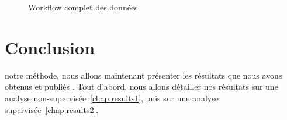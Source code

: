 			\begin{figure}
				\begin{center}
					\def\svgwidth{\columnwidth}
					\caption{Workflow complet des données.}
					\label{fig:Workflow}
				\end{center}
			\end{figure}

	\section{\textcolor{green!45!black}{Conclusion}}
		 notre méthode, nous allons maintenant présenter les résultats que nous avons obtenus et publiés \citep{Garcia2011,Garcia2012}. Tout d'abord, nous allons détailler nos résultats sur une analyse non-supervisée~\ref{chap:results1}, puis sur une analyse supervisée~\ref{chap:results2}.